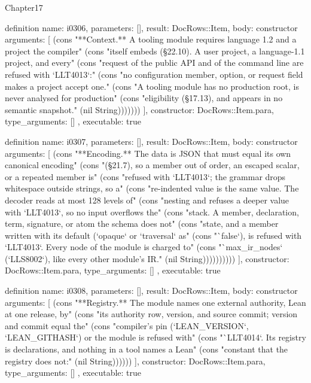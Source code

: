 \begin{lexlean}{Chapter17}
\begin{semanticmodule}
definition{
  name: i0306,
  parameters: [],
  result: DocRows::Item,
  body: constructor{
    arguments: [
      (cons "**Context.** A tooling module requires language 1.2 and a project the compiler" (cons "itself embeds (§22.10). A user project, a language-1.1 project, and every" (cons "request of the public API and of the command line are refused with `LLT4013`:" (cons "no configuration member, option, or request field makes a project accept one." (cons "A tooling module has no production root, is never analysed for production" (cons "eligibility (§17.13), and appears in no semantic snapshot." (nil String)))))))
    ],
    constructor: DocRows::Item.para,
    type_arguments: []
  },
  executable: true
}

definition{
  name: i0307,
  parameters: [],
  result: DocRows::Item,
  body: constructor{
    arguments: [
      (cons "**Encoding.** The data is JSON that must equal its own canonical encoding" (cons "(§21.7), so a member out of order, an escaped scalar, or a repeated member is" (cons "refused with `LLT4013`; the grammar drops whitespace outside strings, so a" (cons "re-indented value is the same value. The decoder reads at most 128 levels of" (cons "nesting and refuses a deeper value with `LLT4013`, so no input overflows the" (cons "stack. A member, declaration, term, signature, or atom the schema does not" (cons "state, and a member written with its default (`opaque` or `traversal` as" (cons "`false`), is refused with `LLT4013`. Every node of the module is charged to" (cons "`max_ir_nodes` (`LLS8002`), like every other module's IR." (nil String))))))))))
    ],
    constructor: DocRows::Item.para,
    type_arguments: []
  },
  executable: true
}

definition{
  name: i0308,
  parameters: [],
  result: DocRows::Item,
  body: constructor{
    arguments: [
      (cons "**Registry.** The module names one external authority, Lean at one release, by" (cons "its authority row, version, and source commit; version and commit equal the" (cons "compiler's pin (`LEAN_VERSION`, `LEAN_GITHASH`) or the module is refused with" (cons "`LLT4014`. Its registry is declarations, and nothing in a tool names a Lean" (cons "constant that the registry does not:" (nil String))))))
    ],
    constructor: DocRows::Item.para,
    type_arguments: []
  },
  executable: true
}


\end{semanticmodule}
\end{lexlean}
